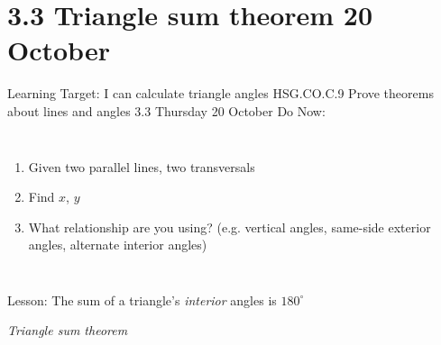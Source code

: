 \section{3.3 Triangle sum theorem \hfill 20 October \,}
\begin{frame}{Learning Target: I can calculate triangle angles}
{HSG.CO.C.9 Prove theorems about lines and angles  \hfill \alert{3.3 Thursday 20 October}}
  Do Now: 
  \begin{columns}
    \begin{enumerate}
      \item Given two parallel lines, two transversals
      \item Find $x$, $y$
      \item What relationship are you using? (e.g. vertical angles, same-side exterior angles, alternate interior angles)
    \end{enumerate}
  \end{columns} \vspace{0.8cm}
  Lesson: The sum of a triangle's \emph{interior} angles is $180^\circ$ \par \medskip 
  \hspace{1.2cm} \emph{Triangle sum theorem}
\end{frame}

